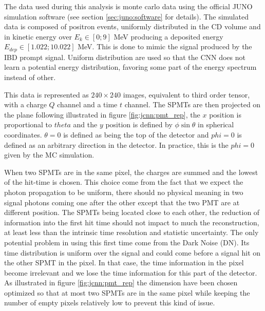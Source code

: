 The data used during this analysis is monte carlo data using the official JUNO simulation software (see section \ref{sec:juno:software} for details). The simulated data is composed of positron events, uniformly distributed in the CD volume and in kinetic energy over $E_k \in [0; 9]$ MeV producing a deposited energy $E_{dep} \in [1.022; 10.022]$ MeV. This is done to mimic the signal produced by the IBD prompt signal. Uniform distribution are used so that the CNN does not learn a potential energy distribution, favoring some part of the energy spectrum instead of other.

This data is represented as $240 \times 240$ images, equivalent to third order tensor, with a charge $Q$ channel and a time $t$ channel. The SPMTs are then projected on the plane following illustrated in figure \ref{fig:jcnn:pmt_rep}, the $x$ position is proportional to $theta$ and the $y$ position is defined by $\phi \sin{\theta}$ in spherical coordinates. $\theta = 0$ is defined as being the top of the detector and $phi = 0$ is defined as an arbitrary direction in the detector. In practice, this is the $phi = 0$ given by the MC simulation.

When two SPMTs are in the same pixel, the charges are summed and the lowest of the hit-time is chosen. This choice come from the fact that we expect the photon propagation to be uniform, there should no physical meaning in two signal photons coming one after the other except that the two PMT are at different position. The SPMTs being located close to each other, the reduction of information into the first hit time should not impact to much the reconstruction, at least less than the intrinsic time resolution and statistic uncertainty. The only potential problem in using this first time come from the Dark Noise (DN). Its time distribution is uniform over the signal and could come before a signal hit on the other SPMT in the pixel. In that case, the time information in the pixel become irrelevant and we lose the time information for this part of the detector.
As illustrated in figure \ref{fig:jcnn:pmt_rep} the dimension have been chosen optimized so that at most two SPMTs are in the same pixel while keeping the number of empty pixels relatively low to prevent this kind of issue.

